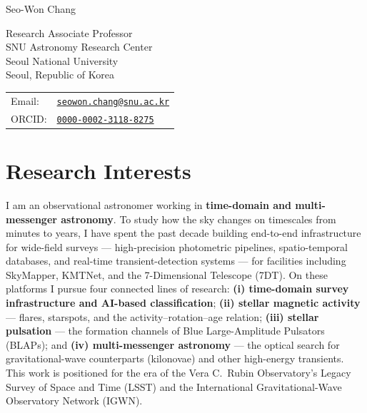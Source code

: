 \documentclass[letterpaper,11pt]{article}
\def\name{Seo-Won Chang}
\begin{document}
{\huge \name}

\vspace{0.2in}

\begin{minipage}{0.52\linewidth}
  Research Associate Professor \\
  SNU Astronomy Research Center \\
  Seoul National University \\
  Seoul, Republic of Korea
\end{minipage}
\begin{minipage}{0.46\linewidth}
  \begin{tabular}{ll}
    Email: & \href{mailto:seowon.chang@snu.ac.kr}{\tt seowon.chang@snu.ac.kr} \\
    ORCID: & \href{https://orcid.org/0000-0002-3118-8275}{\tt 0000-0002-3118-8275} \\
  \end{tabular}
\end{minipage}

\vspace{0.15in}

\section*{Research Interests}

I am an observational astronomer working in \textbf{time-domain and multi-messenger
astronomy}. To study how the sky changes on timescales from minutes to years, I have
spent the past decade building end-to-end infrastructure for wide-field surveys ---
high-precision photometric pipelines, spatio-temporal databases, and real-time
transient-detection systems --- for facilities including SkyMapper, KMTNet, and the
7-Dimensional Telescope (7DT). On these platforms I pursue four connected lines of
research: \textbf{(i) time-domain survey infrastructure and AI-based classification};
\textbf{(ii) stellar magnetic activity} --- flares, starspots, and the
activity--rotation--age relation; \textbf{(iii) stellar pulsation} --- the formation
channels of Blue Large-Amplitude Pulsators (BLAPs); and \textbf{(iv) multi-messenger
astronomy} --- the optical search for gravitational-wave counterparts (kilonovae) and
other high-energy transients. This work is positioned for the era of the Vera C.\ Rubin
Observatory's Legacy Survey of Space and Time (LSST) and the International
Gravitational-Wave Observatory Network (IGWN).
\end{document}
